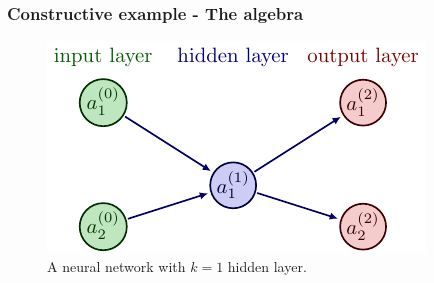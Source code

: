 \documentclass[11pt]{article}
\begin{document}
\subsubsection{Constructive example - The algebra}

\begin{figure}[ht]
    \centering
    \includegraphics{./figures/neural_nets/neural_net_3.pdf}
    \caption{\centering A neural network with $k=1$ hidden layer.}
    \label{fig:neural_nets_simple_example}
\end{figure}
\end{document}
